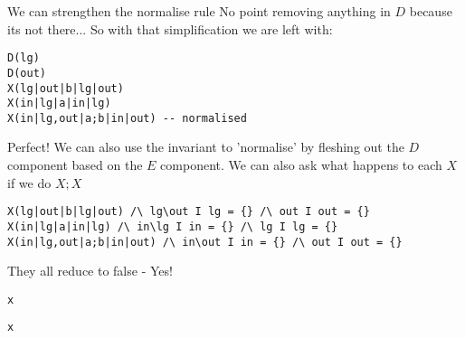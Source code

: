 We can strengthen the normalise rule
No point removing anything in $D$ because its not there...
So with that simplification we are left with:
{\footnotesize\begin{verbatim}
D(lg)
D(out)
X(lg|out|b|lg|out)
X(in|lg|a|in|lg)
X(in|lg,out|a;b|in|out) -- normalised
\end{verbatim}}
Perfect!
We can also use the invariant to 'normalise' by fleshing out the $D$
component based on the $E$ component.
We can also ask what happens to each $X$ if we do $X;X$
{\footnotesize\begin{verbatim}
X(lg|out|b|lg|out) /\ lg\out I lg = {} /\ out I out = {}
X(in|lg|a|in|lg) /\ in\lg I in = {} /\ lg I lg = {}
X(in|lg,out|a;b|in|out) /\ in\out I in = {} /\ out I out = {}
\end{verbatim}}
They all reduce to false - Yes!

\newpage
{\footnotesize\begin{verbatim}
x
\end{verbatim}}

\newpage
{\footnotesize\begin{verbatim}
x
\end{verbatim}}
